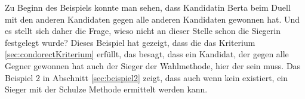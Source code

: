 Zu Beginn des Beispiels konnte man sehen, dass Kandidatin Berta beim Duell mit den anderen Kandidaten gegen alle anderen Kandidaten gewonnen hat. Und es stellt sich daher die Frage, wieso nicht an dieser Stelle schon die Siegerin festgelegt wurde? Dieses Beispiel hat gezeigt, dass die \schulze das \condorcet Kriterium \ref{sec:condorectKriterium} erfüllt, das besagt, dass ein Kandidat, der gegen alle Gegner gewonnen hat auch der Sieger der Wahlmethode, hier der \schulze sein muss. Das Beispiel 2 in Abschnitt \ref{sec:beispiel2} zeigt, dass auch wenn kein \condorcetSieger existiert, ein Sieger mit der Schulze Methode ermittelt werden kann.




